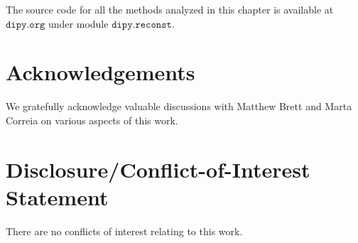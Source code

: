 \documentclass{bioinfo}
\begin{document}
The source code for all the methods analyzed in this chapter is available
at $\texttt{dipy.org}$ under module $\texttt{dipy.reconst}$.

\section*{Acknowledgements}
We gratefully acknowledge valuable discussions with Matthew Brett and Marta Correia on various aspects of this work.

\section*{Disclosure/Conflict-of-Interest Statement}
There are no conflicts of interest relating to this work.

%

%
%
%
%

\end{document}
